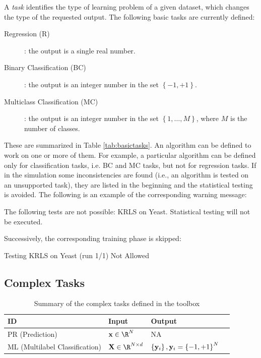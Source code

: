 A \textit{task} identifies the type of learning problem of a given dataset, which changes the type of the requested output. The following basic tasks are currently defined:

\begin{description}
\item[Regression (R)]: the output is a single real number.
\item[Binary Classification (BC)]: the output is an integer number in the set $\left\{-1,+1\right\}$.
\item[Multiclass Classification (MC)]: the output is an integer number in the set $\left\{1,\dots,M\right\}$, where $M$ is the number of classes.
\end{description} 
	
These are summarized in Table \ref{tab:basictasks}. An algorithm can be defined to work on one or more of them. For example, a particular algorithm can be defined only for classification tasks, i.e. BC and MC tasks, but not for regression tasks. If in the simulation some inconsistencies are found (i.e., an algorithm is tested on an unsupported task), they are listed in the beginning and the statistical testing is avoided. The following is an example of the corresponding warning message:

\begin{console}
The following tests are not possible:
	 KRLS on Yeast.
Statistical testing will not be executed.
\end{console}

\noindent Successively, the corresponding training phase is skipped:

\begin{console}
Testing KRLS on Yeast (run 1/1)
	Not Allowed
\end{console}

\subsection{Complex Tasks}

\vspace{-2em}

\begin{center}
\begin{table}[t]
{\centering\hfill{}
\begin{tabular}{llll}
\toprule
ID & Input & Output \\ 
\midrule
PR (Prediction) & $\vect{x} \in \R^N$ & NA \\
ML (Multilabel Classification) & $\vect{X} \in \R^{N \times d}$ & $\left\{ \mathbf{y}_i \right\}, \mathbf{y}_i = \left\{-1, +1\right\}^N$ \\
\bottomrule
\end{tabular}}
\hfill{}
\caption{Summary of the complex tasks defined in the toolbox}
\label{tab:complextasks}
\end{table}
\end{center}

